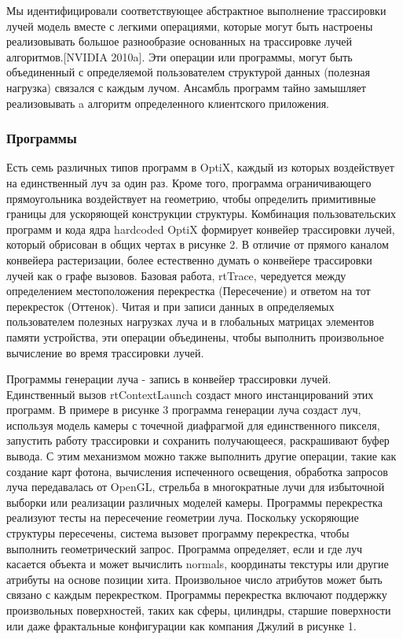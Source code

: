  Мы идентифицировали соответствующее абстрактное выполнение трассировки лучей модель вместе с легкими операциями, которые могут быть настроены реализовывать большое разнообразие основанных на трассировке лучей алгоритмов.[NVIDIA 2010a]. Эти операции или программы, могут быть объединенный с определяемой пользователем структурой данных (полезная нагрузка) связался с каждым лучом. Ансамбль программ тайно замышляет реализовывать a алгоритм определенного клиентского приложения.
\subsubsection{Программы}
Есть семь различных типов программ в OptiX, каждый из которых воздействует на единственный луч за один раз. Кроме того, программа ограничивающего прямоугольника воздействует на геометрию, чтобы определить примитивные границы для ускоряющей конструкции структуры. Комбинация пользовательских программ и кода ядра hardcoded OptiX формирует конвейер трассировки лучей, который обрисован в общих чертах в рисунке 2. В отличие от прямого каналом конвейера растеризации, более естественно думать о конвейере трассировки лучей как о графе вызовов. Базовая работа, rtTrace, чередуется между определением местоположения перекрестка (Пересечение) и ответом на тот перекресток (Оттенок). Читая и при записи данных в определяемых пользователем полезных нагрузках луча и в глобальных матрицах элементов памяти устройства, эти операции объединены, чтобы выполнить произвольное вычисление во время трассировки лучей. 

Программы генерации луча - запись в конвейер трассировки лучей. Единственный вызов rtContextLaunch создаст много инстанцирований этих программ. В примере в рисунке 3 программа генерации луча создаст луч, используя модель камеры с точечной диафрагмой для единственного пикселя, запустить работу трассировки и сохранить получающееся, раскрашивают буфер вывода. С этим механизмом можно также выполнить другие операции, такие как создание карт фотона, вычисления испеченного освещения, обработка запросов луча передавалась от OpenGL, стрельба в многократные лучи для избыточной выборки или реализации различных моделей камеры. Программы перекрестка реализуют тесты на пересечение геометрии луча. Поскольку ускоряющие структуры пересечены, система вызовет программу перекрестка, чтобы выполнить геометрический запрос. Программа определяет, если и где луч касается объекта и может вычислить normals, координаты текстуры или другие атрибуты на основе позиции хита. Произвольное число атрибутов может быть связано с каждым перекрестком. Программы перекрестка включают поддержку произвольных поверхностей, таких как сферы, цилиндры, старшие поверхности или даже фрактальные конфигурации как компания Джулий в рисунке 1.

